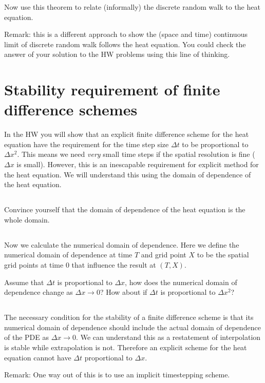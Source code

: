 \documentclass[11pt,letterpaper]{article}
\begin{document}
Now use this theorem to relate (informally) the discrete random walk to the heat equation.

Remark: this is a different approach to show the (space and time) continuous limit of discrete random walk follows the heat equation. You could check the answer of your solution to the HW problems using this line of thinking.

\section{Stability requirement of finite difference schemes}
In the HW you will show that an explicit finite difference scheme for the heat equation have the requirement for the time step size $\Delta t$ to be proportional to $\Delta x^2$. This means we need \emph{very} small time steps if the spatial resolution is fine ($\Delta x$ is small). However, this is an inescapable requirement for explicit method for the heat equation. We will understand this using the domain of dependence of the heat equation.

\subsection{}
Convince yourself that the domain of dependence of the heat equation is the whole domain.

\subsection{}
Now we calculate the numerical domain of dependence. Here we define the numerical domain of dependence at time $T$ and grid point $X$ to be the spatial grid points at time $0$ that influence the result at $(T,X)$.

Assume that $\Delta t$ is proportional to $\Delta x$, how does the numerical domain of dependence change as $\Delta x\to 0$? How about if $\Delta t$ is proportional to $\Delta x^2$?

\subsection{}
The necessary condition for the stability of a finite difference scheme is that its numerical domain of dependence should include the actual domain of dependence of the PDE as $\Delta x\to 0$. We can understand this as a restatement of interpolation is stable while extrapolation is not. Therefore an explicit scheme for the heat equation cannot have $\Delta t$ proportional to $\Delta x$. 

Remark: One way out of this is to use an implicit timestepping scheme.

\vfill
\printbibliography
\end{document}
